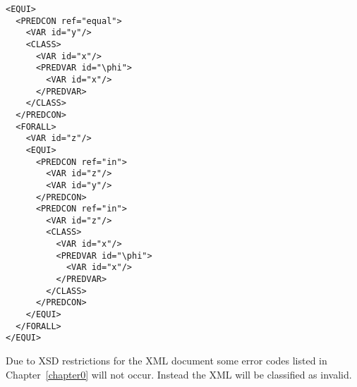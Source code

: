 \documentclass[a4paper,german,10pt,twoside]{book}
\theoremstyle{definition}
\theoremstyle{remark}
\begin{document}
\begin{verbatim}
<EQUI>
  <PREDCON ref="equal">
    <VAR id="y"/>
    <CLASS>
      <VAR id="x"/>
      <PREDVAR id="\phi">
        <VAR id="x"/>
      </PREDVAR>
    </CLASS>
  </PREDCON>
  <FORALL>
    <VAR id="z"/>
    <EQUI>
      <PREDCON ref="in">
        <VAR id="z"/>
        <VAR id="y"/>
      </PREDCON>
      <PREDCON ref="in">
        <VAR id="z"/>
        <CLASS>
          <VAR id="x"/>
          <PREDVAR id="\phi">
            <VAR id="x"/>
          </PREDVAR>
        </CLASS>
      </PREDCON>
    </EQUI>
  </FORALL>
</EQUI>
\end{verbatim}

Due to XSD restrictions for the XML document some error codes listed in Chapter~\ref{chapter0} will not occur. Instead the XML will be classified as invalid.



\backmatter

 \printindex
\end{document}

